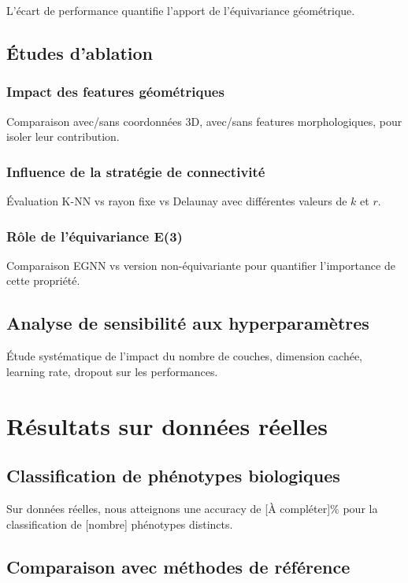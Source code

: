 L'écart de performance quantifie l'apport de l'équivariance géométrique.

\subsection{Études d'ablation}

\subsubsection{Impact des features géométriques}
Comparaison avec/sans coordonnées 3D, avec/sans features morphologiques, pour isoler leur contribution.

\subsubsection{Influence de la stratégie de connectivité}
Évaluation K-NN vs rayon fixe vs Delaunay avec différentes valeurs de $k$ et $r$.

\subsubsection{Rôle de l'équivariance E(3)}
Comparaison EGNN vs version non-équivariante pour quantifier l'importance de cette propriété.

\subsection{Analyse de sensibilité aux hyperparamètres}

Étude systématique de l'impact du nombre de couches, dimension cachée, learning rate, dropout sur les performances.

\section{Résultats sur données réelles}

\subsection{Classification de phénotypes biologiques}

Sur données réelles, nous atteignons une accuracy de [À compléter]\% pour la classification de [nombre] phénotypes distincts.

\subsection{Comparaison avec méthodes de référence}


